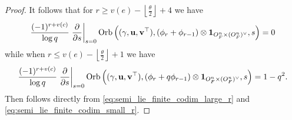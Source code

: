 \begin{proof}
  It follows that for $r \ge v(e) - \left\lfloor \frac{\theta}{2} \right\rfloor + 4$ we have
  \begin{equation}
    \frac{(-1)^{r+v(c)}}{\log q}
    \left. \pdv{}{s} \right\rvert_{s=0}
    \operatorname{Orb} \left( {(\gamma, \mathbf u, \mathbf v^\top)}, (\phi_r + \phi_{r-1}) \otimes \mathbf{1}_{O_F^n \times (O_F^n)^\vee}, s \right)
    = 0
    \label{eq:semi_lie_finite_codim_large_r}
  \end{equation}
  while when $r \le v(e) - \left\lfloor \frac{\theta}{2} \right\rfloor + 1$ we have
  \begin{equation}
    \frac{(-1)^{r+v(c)}}{\log q}
    \left. \pdv{}{s} \right\rvert_{s=0}
    \operatorname{Orb} \left( {(\gamma, \mathbf u, \mathbf v^\top)}, (\phi_r + q\phi_{r-1}) \otimes \mathbf{1}_{O_F^n \times (O_F^n)^\vee}, s \right)
    = 1-q^2.
    \label{eq:semi_lie_finite_codim_small_r}
  \end{equation}
  Then  follows directly
  from \eqref{eq:semi_lie_finite_codim_large_r} and \eqref{eq:semi_lie_finite_codim_small_r}.
\end{proof}
